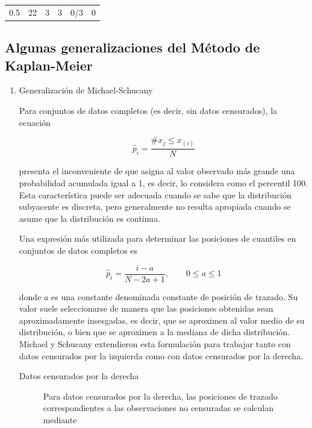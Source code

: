\begin{table}[H]
\begin{tabular}{cccccc}
0.5                                                             & 22                                                     & 3                                                                                 & 3                                                                                      & 0/3                                                                                               & 0                             
\end{tabular}
\end{table}

\subsection*{Algunas generalizaciones del Método de Kaplan-Meier}

\begin{enumerate}
    \item Generalización de Michael-Schucany

Para conjuntos de datos completos (es decir, sin datos censurados), la ecuación

$$\hat{p}_i = \frac{\#{x_j\leq x_{(i)}}}{N}$$

presenta el inconveniente de que asigna al valor observado más grande una probabilidad acumulada igual a 1, es decir, lo considera como el percentil 100. Esta característica puede ser adecuada cuando se sabe que la distribución subyacente es discreta, pero generalmente no resulta apropiada cuando se asume que la distribución es continua.

Una expresión más utilizada para determinar las posiciones de cuantiles en conjuntos de datos completos es

$$\hat{p}_i = \frac{i-a}{N-2a+1},\qquad 0\leq a\leq 1$$

donde $a$ es una constante denominada constante de posición de trazado. Su valor suele seleccionarse de manera que las posiciones obtenidas sean aproximadamente insesgadas, es decir, que se aproximen al valor medio de su distribución, o bien que se aproximen a la mediana de dicha distribución. Michael y Schucany extendieron esta formulación para trabajar tanto con datos censurados por la izquierda como con datos censurados por la derecha.

\begin{description}
    \item[Datos censurados por la derecha] 

Para datos censurados por la derecha, las posiciones de trazado correspondientes a las observaciones no censuradas se calculan mediante


\end{description}
\end{enumerate}
